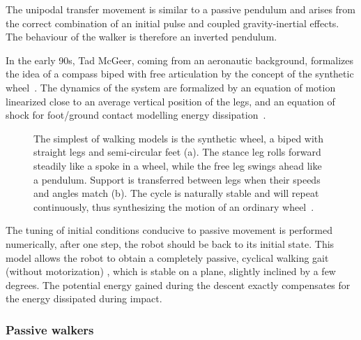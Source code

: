 The unipodal transfer movement is similar to a passive pendulum and arises from the correct combination of an initial pulse and coupled gravity-inertial effects. The behaviour of the walker is therefore an inverted pendulum.

In the early 90s, Tad McGeer, coming from an aeronautic background, formalizes the idea of a compass biped with free articulation by the concept of the synthetic wheel~\parencite{mcgeer1990passive}.
The dynamics of the system are formalized by an equation of motion linearized close to an average vertical position of the legs, and an equation of shock for foot/ground contact modelling energy dissipation~\parencite{mcgeer1992principles}.

\begin{figure}[tb]
\centering
    \hfil
    \caption{The simplest of walking models is the synthetic wheel, a biped with straight legs and semi-circular feet (a). The stance leg rolls forward steadily like a spoke in a wheel, while the free leg swings ahead like a pendulum. Support is transferred between legs when their speeds and angles match (b). The cycle is naturally stable and will repeat continuously, thus synthesizing the motion of an ordinary wheel~\parencite{mcgeer1992principles}.}
    \label{fig:synthetic-wheel}
\end{figure}


The tuning of initial conditions conducive to passive movement is performed numerically, after one step, the robot should be back to its initial state. This model allows the robot to obtain a completely passive, cyclical walking gait (without motorization) , which is stable on a plane, slightly inclined by a few degrees. The potential energy gained during the descent exactly compensates for the energy dissipated during impact.


\subsubsection{Passive walkers} %

\begin{figure}[tb]
\centering
    \hfil
    \caption{}
    \label{fig:mcgeer_work}
\end{figure}

